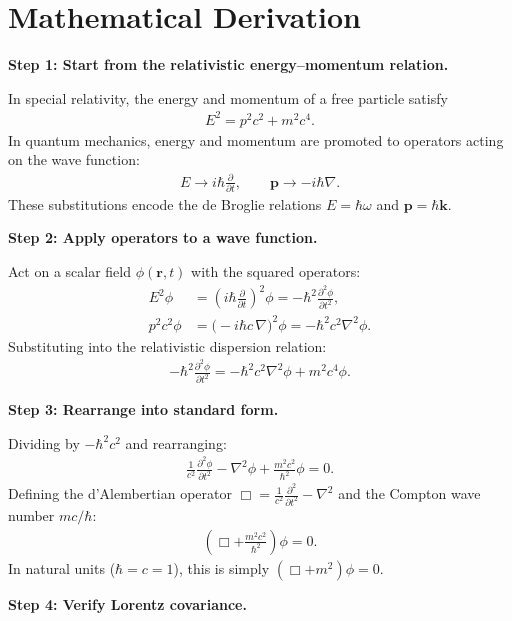 \section*{Mathematical Derivation}

\textbf{Step 1: Start from the relativistic energy--momentum relation.}

In special relativity, the energy and momentum of a free particle satisfy
\begin{align}
E^2 = p^2c^2 + m^2c^4.
\end{align}
In quantum mechanics, energy and momentum are promoted to operators acting on the wave function:
\begin{align}
E \to i\hbar\frac{\partial}{\partial t}, \qquad \mathbf{p} \to -i\hbar\nabla.
\end{align}
These substitutions encode the de Broglie relations $E = \hbar\omega$ and $\mathbf{p} = \hbar\mathbf{k}$.

\textbf{Step 2: Apply operators to a wave function.}

Act on a scalar field $\phi(\mathbf{r}, t)$ with the squared operators:
\begin{align}
E^2\phi &= \left(i\hbar\frac{\partial}{\partial t}\right)^2\phi = -\hbar^2\frac{\partial^2\phi}{\partial t^2}, \\
p^2c^2\phi &= \bigl(-i\hbar c\,\nabla\bigr)^2\phi = -\hbar^2 c^2\nabla^2\phi.
\end{align}
Substituting into the relativistic dispersion relation:
\begin{align}
-\hbar^2\frac{\partial^2\phi}{\partial t^2} = -\hbar^2 c^2\nabla^2\phi + m^2c^4\phi.
\end{align}

\textbf{Step 3: Rearrange into standard form.}

Dividing by $-\hbar^2 c^2$ and rearranging:
\begin{align}
\frac{1}{c^2}\frac{\partial^2\phi}{\partial t^2} - \nabla^2\phi + \frac{m^2c^2}{\hbar^2}\phi = 0.
\end{align}
Defining the d'Alembertian operator $\Box = \frac{1}{c^2}\frac{\partial^2}{\partial t^2} - \nabla^2$ and the Compton wave number $m c/\hbar$:
\begin{align}
\boxed{\left(\Box + \frac{m^2c^2}{\hbar^2}\right)\phi = 0.}
\end{align}
In natural units ($\hbar = c = 1$), this is simply $(\Box + m^2)\phi = 0$.

\textbf{Step 4: Verify Lorentz covariance.}

